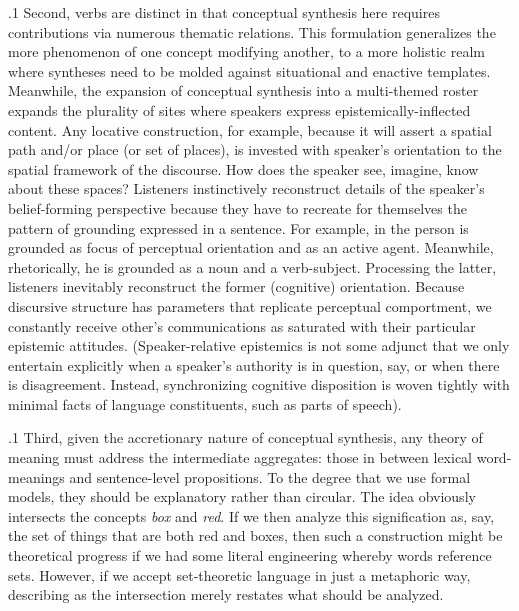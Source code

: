\documentclass[11pt, twocolumn]{article}
\begin{document}
\p.1{%
Second, verbs are distinct in that conceptual synthesis here
requires contributions via numerous thematic relations.
This formulation generalizes the more  phenomenon
of one concept modifying another, to a more holistic
realm where syntheses need to be molded against situational
and enactive templates.  Meanwhile, the expansion of conceptual
synthesis into a multi-themed roster expands the plurality of sites
where speakers express epistemically-inflected content.
Any locative construction, for example, because it will assert a
spatial path and/or place (or set of places), is invested with
speaker's orientation to the spatial framework of the discourse.
How does the speaker see, imagine, know about these spaces?
Listeners instinctively reconstruct details of the speaker's
belief-forming perspective because they have to recreate
for themselves the pattern of grounding expressed in a sentence.
For example, in  the person is grounded as
focus of perceptual orientation and as an active agent.  Meanwhile,
rhetorically, he is grounded as a noun and a verb-subject.
Processing the latter, listeners inevitably reconstruct
the former (cognitive) orientation.
Because discursive structure has parameters that replicate
perceptual comportment, we constantly receive other's communications
as saturated with their particular epistemic attitudes.
(Speaker-relative epistemics is not some adjunct that we only
entertain explicitly when a speaker's authority is in question,
say, or when there is disagreement.  Instead, synchronizing
cognitive disposition is woven tightly with minimal
facts of language constituents, such as parts of speech).
} %

\p.1{%
Third, given the accretionary nature of conceptual synthesis,
any theory of meaning must address the intermediate
aggregates: those in between lexical word-meanings and sentence-level
propositions.  To the degree that we use formal models,
they should be explanatory rather than circular.
The idea  obviously intersects the
concepts \textit{box} and \textit{red}.  If we then analyze this
signification as, say, the set of things that are both
red and boxes, then such a construction might be
theoretical progress if we had some literal engineering
whereby words reference sets.  However, if we accept set-theoretic
language in just a metaphoric way, describing
 as the intersection \redbox{} merely restates what
should be analyzed.
} %
\end{document}
